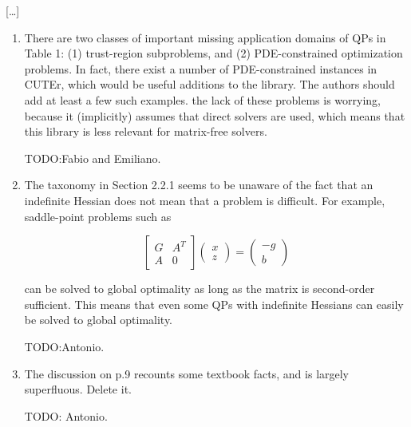 \documentclass[11pt]{article}
\newcommand{\rep}[1]{{\textcolor{acblue}{#1}}}
\newcommand{\leo}[1]{{\color{red}#1}}
\begin{document}
\rep{[\dots] }

{\it
\begin{enumerate}

\item There are two classes of important missing application domains of QPs in Table 1: (1) trust-region subproblems, and (2) PDE-constrained optimization problems. In fact, there exist a number of PDE-constrained instances in CUTEr, which would be useful additions to the library. The authors should add at least a few such examples. the lack of these problems is worrying, because
it (implicitly) assumes that direct solvers are used, which means that this library is less relevant for matrix-free solvers.

\rep{
TODO:Fabio and Emiliano. 
}


\item The taxonomy in Section 2.2.1 seems to be unaware of the fact that an indefinite Hessian does not mean that a problem is difficult. For example, saddle-point problems such as

$$ \begin{bmatrix}
G & A^T\\
A & 0
\end{bmatrix}
\begin{pmatrix}
x \\
z 
\end{pmatrix}
=
\begin{pmatrix}
-g \\
b 
\end{pmatrix}
$$


can be solved to global optimality as long as the matrix is second-order sufficient. This means
that even some QPs with indefinite Hessians can easily be solved to global optimality.

\rep{TODO:Antonio. 
}


\item The discussion on p.9 recounts some textbook facts, and is largely superfluous. Delete it.

\rep{TODO: Antonio.
}



\end{enumerate}}
\end{document}
